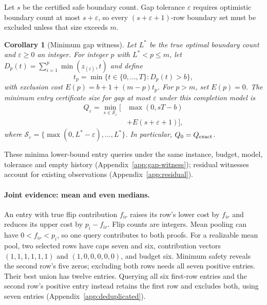 \documentclass[11pt]{article}
\newtheorem{corollary}{Corollary}
\begin{document}
Let $s$ be the certified safe boundary count. Gap tolerance $\varepsilon$ requires optimistic boundary count at most $s+\varepsilon$, so every $(s+\varepsilon+1)$-row boundary set must be excluded unless that size exceeds $m$.
\begin{corollary}[Minimum gap witness]
\label{cor:gap-witness}
Let $L^*$ be the true optimal boundary count and $\varepsilon\ge0$ an integer. For integer $p$ with $L^*<p\le m$, let $D_p(t)=\sum_{i=1}^{p}\min(z_{(i)},t)$ and define
\[
 t_p=\min\{t\in\{0,\ldots,T\}:D_p(t)>b\},
\]
with exclusion cost $E(p)=b+1+(m-p)t_p$. For $p>m$, set $E(p)=0$. The minimum entry certificate size for gap at most $\varepsilon$ under this completion model is
\begin{equation}
 \begin{aligned}
 Q_\varepsilon=\min_{s\in\mathcal S_\varepsilon}\big[&\max(0,sT-b)\\
 &+E(s+\varepsilon+1)\big],
 \end{aligned}
 \label{eq:gap-witness}
\end{equation}
where $\mathcal S_\varepsilon=\{\max(0,L^*-\varepsilon),\ldots,L^*\}$. In particular, $Q_0=Q_{\rm exact}$.
\end{corollary}
These minima lower-bound entry queries under the same instance, budget, model, tolerance and empty history (Appendix~\ref{app:gap-witness}); residual witnesses account for existing observations (Appendix~\ref{app:residual}).


\paragraph{Joint evidence: mean and even medians.}
An entry with true flip contribution $f_{ir}$ raises its row's lower cost by $f_{ir}$ and reduces its upper cost by $p_i-f_{ir}$. Flip counts are integers. Mean pooling can have $0<f_{ir}<p_i$, so one query contributes to both proofs. For a realizable mean pool, two selected rows have caps seven and six, contribution vectors $(1,1,1,1,1,1)$ and $(1,0,0,0,0,0)$, and budget six. Minimum safety reveals the second row's five zeros; excluding both rows needs all seven positive entries. Their best union has twelve entries. Querying all six first-row entries and the second row's positive entry instead retains the first row and excludes both, using seven entries (Appendix~\ref{app:deduplicated}).
\end{document}
